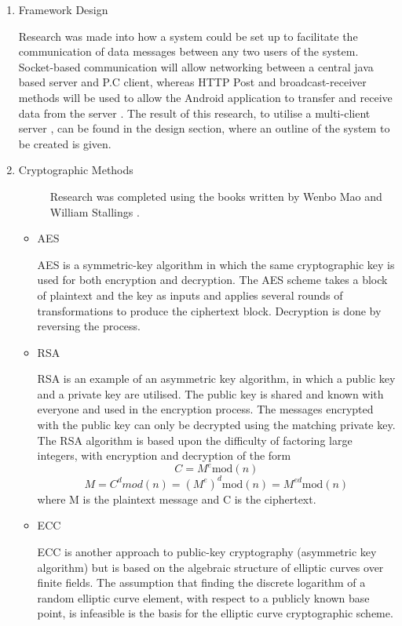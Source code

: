 \documentclass[a4paper,11pt]{article}
\begin{document}
\begin{enumerate}
  \item
  \begin{description}
    \item[Framework Design] 
  \end{description}
  Research was made into how a system could be set up to facilitate the communication of data messages between any two users of the system. Socket-based communication will allow networking between a central java based server and P.C client, whereas HTTP Post and broadcast-receiver methods will be used to allow the Android application to transfer and receive data from the server \cite{markogargenta}. The result of this research, to utilise a multi-client server \cite{ydanielliang}, can be found in the design section, where an outline of the system to be created is given.
  \item
  \begin{description}
    \item[Cryptographic Methods]
    Research was completed using the books written by Wenbo Mao \cite{wenbomao} and William Stallings \cite{willstallings}.
  \end{description}
    \begin{itemize}
      \item
      \begin{description}
        \item[AES] 
      \end{description}
      AES is a symmetric-key algorithm in which the same cryptographic key is used for both encryption and decryption. The AES scheme takes a block of plaintext and the key as inputs and applies several rounds of transformations to produce the ciphertext block. Decryption is done by reversing the process.
      \item
      \begin{description}
        \item[RSA] 
      \end{description}
      RSA is an example of an asymmetric key algorithm, in which a public key and a private key are utilised. The public key is shared and known with
everyone and used in the encryption process. The messages encrypted with
the public key can only be decrypted using the matching private key. The RSA algorithm is based upon the difficulty of factoring large
integers, with encryption and decryption of the form 
\[ C = M^{e} \mathrm{mod}(n) \]
\[M = C^{d} mod(n) = (M^{e})^{d} \mathrm{mod}(n) = M^{ed} \mathrm{mod}(n) \]
where M is the plaintext message and C is the ciphertext.
      \item
      \begin{description}
        \item[ECC] 
      \end{description}
      ECC is another approach to public-key cryptography (asymmetric key algorithm) but is based on the algebraic structure of elliptic curves over finite fields. The assumption that finding the discrete logarithm of a random elliptic curve element, with respect to a publicly known base point, is infeasible is the basis for the elliptic curve cryptographic scheme.
    \end{itemize}


\end{enumerate}
\end{document}
